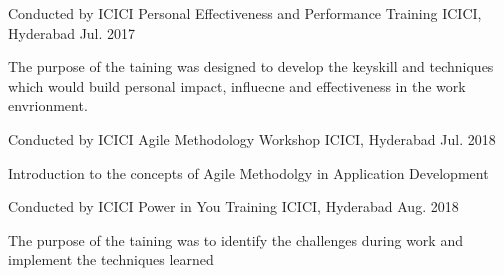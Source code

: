 \begin{cventries}
  \cventry
    {Conducted by ICICI}
    {Personal Effectiveness and Performance Training}
    {ICICI, Hyderabad}
    {Jul. 2017}
    {
      \begin{cvitems}
        \item {The purpose of the taining was designed to develop the keyskill and techniques which would build personal impact, influecne and effectiveness in the work envrionment.}
      \end{cvitems}
    }
  \cventry
    {Conducted by ICICI}
    {Agile Methodology Workshop}
    {ICICI, Hyderabad}
    {Jul. 2018}
    {
      \begin{cvitems}
        \item {Introduction to the concepts of Agile Methodolgy in Application Development}
      \end{cvitems}
    }
   \cventry
    {Conducted by ICICI}
    {Power in You Training}
    {ICICI, Hyderabad}
    {Aug. 2018}
    {
      \begin{cvitems}
        \item {The purpose of the taining was to identify the challenges during work and implement the techniques learned}
      \end{cvitems}
    }
\end{cventries}
